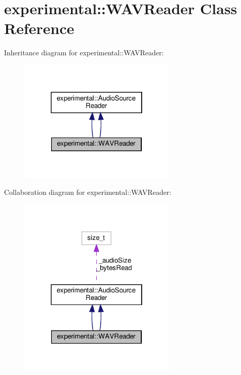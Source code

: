 \hypertarget{classexperimental_1_1WAVReader}{}\section{experimental\+:\+:W\+A\+V\+Reader Class Reference}
\label{classexperimental_1_1WAVReader}


Inheritance diagram for experimental\+:\+:W\+A\+V\+Reader\+:
\nopagebreak
\begin{figure}[H]
\begin{center}
\leavevmode
\includegraphics[width=214pt]{classexperimental_1_1WAVReader__inherit__graph}
\end{center}
\end{figure}


Collaboration diagram for experimental\+:\+:W\+A\+V\+Reader\+:
\nopagebreak
\begin{figure}[H]
\begin{center}
\leavevmode
\includegraphics[width=214pt]{classexperimental_1_1WAVReader__coll__graph}
\end{center}
\end{figure}

